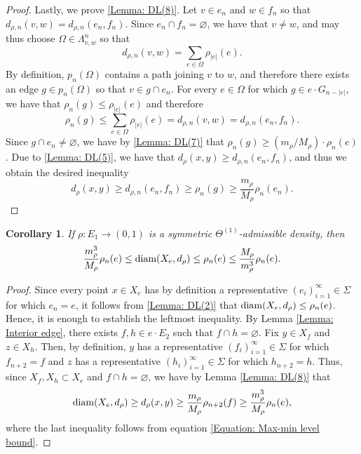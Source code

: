 \documentclass{amsart}
\newcommand{\diam}{{\rm diam}}
\newtheorem{corollary}[equation]{Corollary}
\numberwithin{equation}{section}
\theoremstyle{definition}
\theoremstyle{remark}
\begin{document}
\begin{proof}
    Lastly, we prove \ref{Lemma: DL(8)}. Let \(v\in e_n\) and \(w\in f_n\) so that \(d_{\rho,n}(v,w)=d_{\rho,n}(e_n,f_n)\). Since \(e_n\cap f_n=\varnothing\), we have that \(v\neq w\), and may thus choose \(\Omega\in\Lambda^n_{v,w}\) so that 
        \[
            d_{\rho,n}(v,w)=\sum_{e\in \Omega}\rho_{\lvert e \rvert}(e).
        \]
    By definition, \(p_n(\Omega)\) contains a path joining \(v\) to \(w\), and therefore there exists an edge \(g\in p_n(\Omega)\) so that \(v\in g\cap e_n\). For every \(e\in\Omega\) for which \(g\in e\cdot G_{n-\lvert e \rvert}\), we have that \(\rho_n(g)\leq\rho_{\lvert e \rvert}(e)\) and therefore
        \[
            \rho_n(g)\leq\sum_{e\in \Omega}\rho_{\lvert e \rvert}(e)=d_{\rho,n}(v,w)=d_{\rho,n}(e_n,f_n).
        \]
    Since \(g\cap e_n\neq\varnothing\), we have by \ref{Lemma: DL(7)} that \(\rho_n(g)\geq (m_\rho/M_\rho)\cdot \rho_n(e)\). Due to \ref{Lemma: DL(5)}, we have that \(d_\rho(x,y)\geq d_{\rho,n}(e_n,f_n)\), and thus we obtain the desired inequality
        \[
            d_\rho(x,y)\geq d_{\rho,n}(e_n,f_n)\geq \rho_n(g)\geq\frac{m_\rho}{M_\rho}\rho_n(e_n).
        \]
\end{proof}

\begin{corollary}\label{Corollary: Diameter comparable to weight}
    If \(\rho\colon E_1\to (0,1)\) is a symmetric \(\Theta^{(1)}\)-admissible density, then
        \begin{equation}\label{Equation: Diameter comparable to weight}
            \frac{m_\rho^3}{M_\rho}\rho_n(e)\leq \diam (X_e,d_\rho)\leq \rho_n(e)\leq \frac{M_\rho}{m_\rho^3}\rho_n(e).
        \end{equation}
\end{corollary}
\begin{proof}
    Since every point \(x\in X_e\) has by definition a representative \((e_i)_{i=1}^\infty\in \Sigma\) for which \(e_n=e\), it follows from \ref{Lemma: DL(2)} that \(\diam(X_e,d_\rho)\leq \rho_n(e)\). Hence, it is enough to establish the leftmost inequality. By Lemma \ref{Lemma: Interior edge}, there exists \(f,h\in e\cdot E_2\) such that \(f\cap h=\varnothing\). Fix \(y\in X_f\) and \(z\in X_h\). Then, by definition, \(y\) has a representative \((f_i)_{i=1}^\infty\in \Sigma\) for which \(f_{n+2}=f\) and \(z\) has a representative \((h_i)_{i=1}^\infty\in \Sigma\) for which \(h_{n+2}=h\). Thus, since \(X_f,X_h\subset X_e\) and \(f\cap h =\varnothing\), we have by Lemma \ref{Lemma: DL(8)} that 
        \[
            \diam(X_e,d_\rho)\geq d_\rho(x,y)\geq \frac{m_\rho}{M_\rho}\rho_{n+2}(f)\geq\frac{m_\rho^3}{M_\rho}\rho_n(e),
        \]
    where the last inequality follows from equation \eqref{Equation: Max-min level bound}.
\end{proof}
\end{document}
